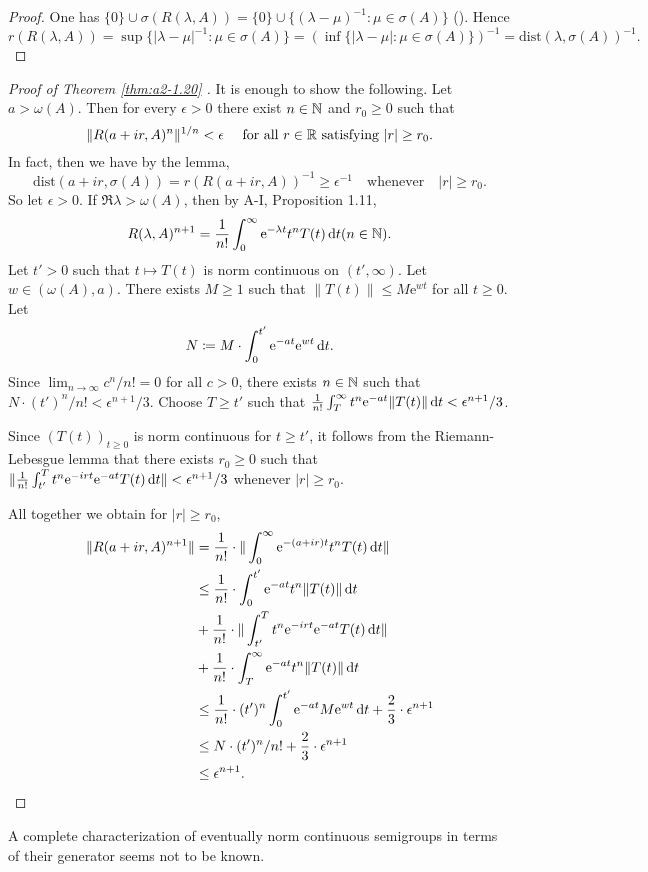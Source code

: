 \begin{proof}
One has $\{0\} \cup \sigma(R(\lambda,A)) = \{0\} \cup \{(\lambda-\mu)^{-1} \colon \mu \in \sigma(A)\}$ (\citet[Lemma~ 2.11]{davies:1980}).
Hence 
\[
r(R(\lambda,A)) = \sup \{|\lambda-\mu|^{-1} \colon \mu \in \sigma(A)\} = 
(\inf \{|\lambda-\mu| \colon \mu \in \sigma(A)\})^{-1} = \text{dist}(\lambda,\sigma(A))^{-1}.
\]
\end{proof}
\begin{proof}[Proof of Theorem  \ref{thm:a2-1.20}  ]
It is enough to show the following.
Let $a > \omega(A)$.
Then for every $\epsilon > 0$ there exist $n \in \mathbb{N}$ and $r_0 \geq 0$ such that
\[
\|R(a+ir,A)^n\|^{1/n} < \epsilon \quad  \text{ for all } r \in \mathbb{R} \text{ satisfying } |r| \geq r_{0}.
\]
In fact, then we have by the lemma, 
\[
\text{dist}(a+ir,\sigma(A)) = r(R(a+ir,A))^{-1} \geq \epsilon^{-1} \quad \text{whenever} \quad |r| \geq r_{0}.
\]
So let $\epsilon > 0$.
If $\Re\lambda > \omega(A)$, then by A-I, Proposition 1.11,
\[
R(\lambda,A)^{n+1} = \frac{1}{n!}\int_0^\infty \mathrm{e}^{-\lambda t}t^nT(t) \mathop{}\!\mathrm{d}{t} (n \in \mathbb{N}).
\]
Let $t' > 0$ such that $t \mapsto T(t)$ is norm continuous on $(t',\infty)$.
Let $w \in (\omega(A),a)$.
There exists $M \geq 1$ such that $\|T(t)\| \leq M\mathrm{e}^{wt}$ for all $t \geq 0$.
Let 
\[
N \coloneqq M\cdot\int_{0}^{t'} \mathrm{e}^{-at}\mathrm{e}^{wt} \mathop{}\!\mathrm{d}{t}.
\]
Since $\lim_{n\to\infty} c^n/n! = 0$ for all $c > 0$, there exists $n \in \mathbb{N}$ such that \\ 
$N\cdot(t')^n/n! < \epsilon^{n+1}/3$.
Choose $T \geq t'$ such that $\frac{1}{n!}\int_T^\infty t^n\mathrm{e}^{-at}\|T(t)\| \mathop{}\!\mathrm{d}{t} < \epsilon^{n+1}/3$.

Since $(T(t))_{t\geq 0}$ is norm continuous for $t \geq t'$, it follows from the Riemann-Lebesgue lemma that there exists $r_{0} \geq 0$ such that 
$\|\frac{1}{n!}\int_{t'}^T t^{n}\mathrm{e}^{-irt}\mathrm{e}^{-at}T(t) \mathop{}\!\mathrm{d}{t}\| < \epsilon^{n+1}/3$ whenever $|r| \geq r_{0}$.

All together we obtain for $|r| \geq r_{0}$,
\begin{align*}
    \|R(a+ir,A)^{n+1}\| & = \frac{1}{n!}\cdot\|\int_0^\infty \mathrm{e}^{-(a+ir)t}t^nT(t) \mathop{}\!\mathrm{d}{t}\| \\
    & \leq \frac{1}{n!}\cdot\int_{0}^{t'} \mathrm{e}^{-at}t^n\|T(t)\| \mathop{}\!\mathrm{d}{t} \\
    & + \frac{1}{n!}\cdot\|\int_{t'}^T t^n\mathrm{e}^{-irt}\mathrm{e}^{-at}T(t) \mathop{}\!\mathrm{d}{t}\| \\
    & + \frac{1}{n!}\cdot\int_T^\infty \mathrm{e}^{-at}t^n\|T(t)\| \mathop{}\!\mathrm{d}{t} \\
    & \leq \frac{1}{n!}\cdot(t')^{n}\int_{0}^{t'} \mathrm{e}^{-at}M\mathrm{e}^{wt} \mathop{}\!\mathrm{d}{t} + \frac{2}{3}\cdot\epsilon^{n+1} \\
    & \leq N\cdot(t')^n/n! + \frac{2}{3}\cdot\epsilon^{n+1} \\
    & \leq \epsilon^{n+1}.
\end{align*}
\end{proof}
A complete characterization of eventually norm continuous semigroups in terms of their generator seems not to be known.

